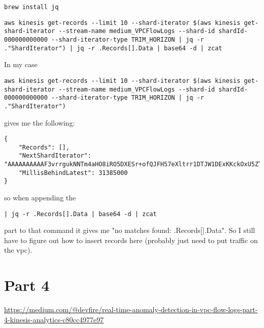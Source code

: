 \begin{lstlisting}[numbers=none]
brew install jq
\end{lstlisting}

\begin{lstlisting}[numbers=none]
aws kinesis get-records --limit 10 --shard-iterator $(aws kinesis get-shard-iterator --stream-name medium_VPCFlowLogs --shard-id shardId-000000000000 --shard-iterator-type TRIM_HORIZON | jq -r ."ShardIterator") | jq -r .Records[].Data | base64 -d | zcat
\end{lstlisting}

In my case 
\begin{lstlisting}[numbers=none]
aws kinesis get-records --limit 10 --shard-iterator $(aws kinesis get-shard-iterator --stream-name medium_VPCFlowLogs --shard-id shardId-000000000000 --shard-iterator-type TRIM_HORIZON | jq -r ."ShardIterator")
\end{lstlisting}
gives me the following:
\begin{lstlisting}[numbers=none, basicstyle=\tinysize]
{
    "Records": [],
    "NextShardIterator": "AAAAAAAAAAF3vrrgukNNTm4aHO8iRO5DXESr+ofQJFH57eXltrr1DTJW1DExKKckOxU5ZT2nFoQ2FOJsmfscXDRl9po0Q9Jb1Zvs9aytKcMLldmE6P7o/HZSC5uhlpT3/tFVAAMQAvqZ41MIFJqFik/kShb9q9oEB3WbYTrigihimcr1haixhIdQv2J6TJhJ6dZ1l6ggsVcnjbok1NZzIyzeABkS8fhLKSsJ/qIV+WmNigYX0MSYVA==",
    "MillisBehindLatest": 31385000
}
\end{lstlisting}

so when appending the 
\begin{lstlisting}[numbers=none]
| jq -r .Records[].Data | base64 -d | zcat
\end{lstlisting}
part to that command it gives me "no matches found: .Records[].Data". So I still have to figure out how to insert records here (probably just need to put traffic on the vpc).


\section{Part 4}
\scriptsize{\url{https://medium.com/@devfire/real-time-anomaly-detection-in-vpc-flow-logs-part-4-kinesis-analytics-c80cc4977e97}}


